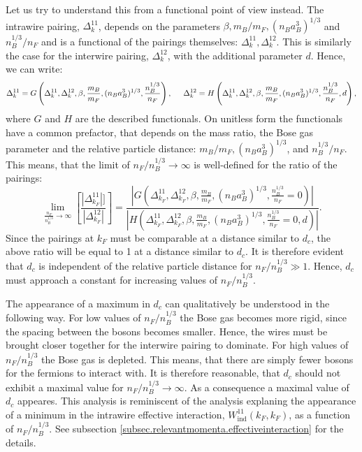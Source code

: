Let us try to understand this from a functional point of view instead. The intrawire pairing, $\Delta^{11}_k$, depends on the parameters $\beta, m_B/m_F, (n_Ba_B^3)^{1/3}$ and $n_B^{1/3}/n_F$ and is a functional of the pairings themselves: $\Delta^{11}_k, \Delta^{12}_k$. This is similarly the case for the interwire pairing, $\Delta^{12}_k$, with the additional parameter $d$. Hence, we can write:
\begin{equation}
\Delta^{11}_k = G\left(\Delta^{11}_k, \Delta^{12}_k, \beta, \frac{m_B}{m_F}, (n_Ba_B^3)^{1/3}, \frac{n_B^{1/3}}{n_F} \right), \hspace{0.5cm} \Delta^{12}_k = H\left(\Delta^{11}_k, \Delta^{12}_k, \beta, \frac{m_B}{m_F}, (n_Ba_B^3)^{1/3}, \frac{n_B^{1/3}}{n_F}, d \right), \nonumber 
\end{equation}
where $G$ and $H$ are the described functionals. On unitless form the functionals have a common prefactor, that depends on the mass ratio, the Bose gas parameter and the relative particle distance: $m_B/m_F, (n_Ba_B^3)^{1/3}$, and $n_B^{1/3}/n_F$. This means, that the limit of $n_F/n_B^{1/3} \to \infty $ is well-defined for the ratio of the pairings:
\begin{equation}
\lim_{\frac{n_F}{n_B^{1/3}} \to \infty} \left[\frac{|\Delta^{11}_{k_F}|]}{|\Delta^{12}_{k_F}|}\right] = \frac{\left|G\left(\Delta^{11}_{k_F}, \Delta^{12}_{k_F}, \beta, \frac{m_B}{m_F}, (n_Ba_B^3)^{1/3}, \frac{n_B^{1/3}}{n_F} = 0 \right)\right|}{\left|H\left(\Delta^{11}_{k_F}, \Delta^{12}_{k_F}, \beta, \frac{m_B}{m_F}, (n_Ba_B^3)^{1/3}, \frac{n_B^{1/3}}{n_F} = 0, d \right)\right|}. \nonumber
\end{equation}
Since the pairings at $k_F$ must be comparable at a distance similar to $d_c$, the above ratio will be equal to 1 at a distance similar to $d_c$. It is therefore evident that $d_c$ is independent of the relative particle distance for $n_F/n_B^{1/3} \gg 1$. Hence, $d_c$ must approach a constant for increasing values of $n_F/n_B^{1/3}$. 

The appearance of a maximum in $d_c$ can qualitatively be understood in the following way. For low values of $n_F/n_B^{1/3}$ the Bose gas becomes more rigid, since the spacing between the bosons becomes smaller. Hence, the wires must be brought closer together for the interwire pairing to dominate. For high values of $n_F/n_B^{1/3}$ the Bose gas is depleted. This means, that there are simply fewer bosons for the fermions to interact with. It is therefore reasonable, that $d_c$ should not exhibit a maximal value for $n_F/n_B^{1/3} \to \infty$. As a consequence a maximal value of $d_c$ appeares. This analysis is reminiscent of the analysis explaning the appearance of a minimum in the intrawire effective interaction, $W_\text{ind}^{11}(k_F,k_F)$, as a function of $n_F/n_B^{1/3}$. See subsection \ref{subsec.relevantmomenta.effectiveinteraction} for the details.  
